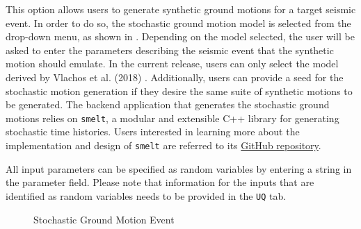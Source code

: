 This option allows users to generate synthetic ground motions for a
target seismic event. In order to do so, the stochastic ground motion
model is selected from the drop-down menu, as shown
in . Depending on the model selected, the
user will be asked to enter the parameters describing the seismic
event that the synthetic motion should emulate. In the current
release, users can only select the model derived by Vlachos et
al. (2018) \cite{vlachos2018predictive}. Additionally, users can
provide a seed for the stochastic motion generation if they desire the
same suite of synthetic motions to be generated. The backend
application that generates the stochastic ground motions relies
on \texttt{smelt}, a modular and extensible C++ library for generating
stochastic time histories. Users interested in learning more about the
implementation and design of
\texttt{smelt} are referred to its
\href{https://github.com/shellshocked2003/Stochastic-Loading-Module}{GitHub repository}.

All input parameters can be specified as random variables by entering
a string in the parameter field. Please note that information for the
inputs that are identified as random variables needs to be provided in
the \texttt{UQ} tab.

\begin{figure}[!htbp]
  \caption{Stochastic Ground Motion Event}
  \label{fig:stochastic_loading}
\end{figure}
